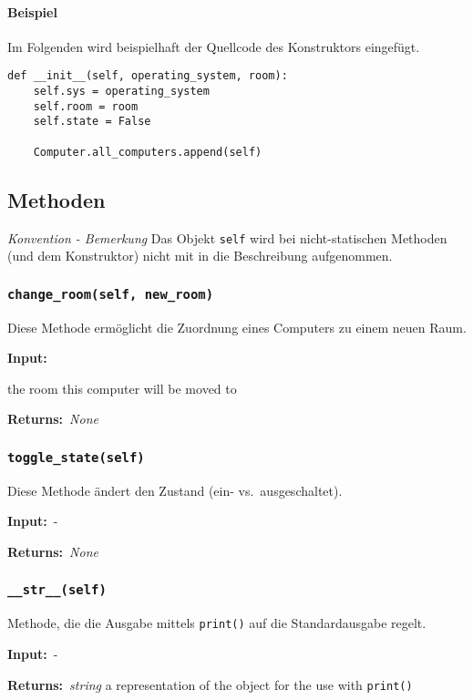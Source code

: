 \documentclass[smallheadings]{scrartcl}
\newcommand{\initem}[2]{\item[\hspace{0.5em} {\normalfont\ttfamily{#1}} {\normalfont\itshape{(#2)}}]}
\newcommand{\bfpara}[1]{
	
	\noindent \textbf{#1:}\,}
\begin{document}
\paragraph{Beispiel} Im Folgenden wird beispielhaft der Quellcode des Konstruktors eingef\"ugt.
	    \begin{lstlisting}
def __init__(self, operating_system, room):
    self.sys = operating_system
    self.room = room
    self.state = False
    
    Computer.all_computers.append(self)	    
	    \end{lstlisting}
\subsection{Methoden}
\textit{Konvention - Bemerkung} Das Objekt \texttt{self} wird bei nicht-statischen Methoden (und dem Konstruktor) nicht mit in die Beschreibung aufgenommen.
\subsubsection{\texttt{change\_room(self, new\_room)}}
       Diese Methode erm\"oglicht die Zuordnung eines Computers zu einem neuen Raum.

\bfpara{Input}
            \begin{compactdesc}
		    \initem{new\_room}{int} the room this computer will be moved to
		\end{compactdesc}
\bfpara{Returns} {\normalfont\itshape{None}}

\subsubsection{\texttt{toggle\_state(self)}}
       Diese Methode \"andert den Zustand (ein- vs.\ ausgeschaltet).

\bfpara{Input} -

\bfpara{Returns} {\normalfont\itshape{None}}
	
	\subsubsection{\texttt{\_\_str\_\_(self)}}
Methode, die die Ausgabe mittels \texttt{print()} auf die Standardausgabe regelt. 

	\bfpara{Input} - 

	\bfpara{Returns}{ \normalfont\itshape{string}} a representation of the object for the use with \texttt{print()}
\end{document}
